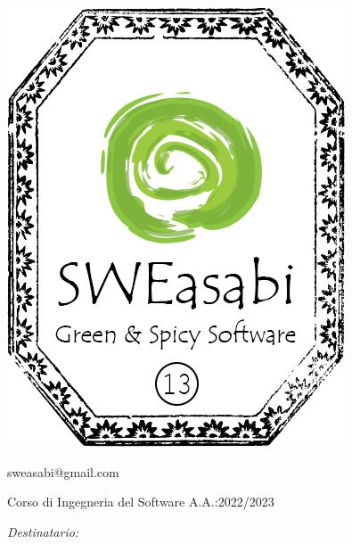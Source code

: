 \documentclass{article}
\begin{document}
\begin{center}
\begin{minipage}{0.49\linewidth}
\begin{flushright}
\begin{minipage}{0.5\linewidth}
\begin{center}
        \includegraphics[width=0.67\linewidth]{../../assets_globali/img/logo_13.png}
        
        \small sweasabi@gmail.com

        \end{center}
        \end{minipage}
        \end{flushright}
    \end{minipage}

    \vspace{1cm}

    Corso di Ingegneria del Software A.A.:2022/2023
    
    \vspace{2cm}

    \begin{minipage}[t]{0.49\linewidth}
        \begin{flushleft}

        \begin{minipage}[t]{0.8\linewidth}
        \begin{flushleft}
        
            \normalsize
            \textit{Destinatario:}
            \vspace{0.5cm}


\end{flushleft}
\end{minipage}
\end{flushleft}
\end{minipage}
\end{center}
\end{document}
